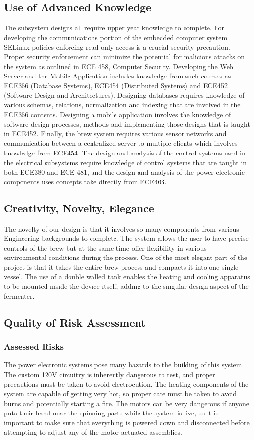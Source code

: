 \documentclass{article}
\begin{document}
\subsection{Use of Advanced Knowledge}
The subsystem designs all require upper year knowledge to complete. For developing the communications portion of the embedded computer system SELinux policies enforcing read only access is a crucial security precaution.  Proper security enforcement can minimize the potential for malicious attacks on the system as outlined in ECE 458, Computer Security.  Developing the Web Server and the Mobile Application includes knowledge from such courses as ECE356 (Database Systems), ECE454 (Distributed Systems) and ECE452 (Software Design and Architectures). Designing databases requires knowledge of various schemas, relations, normalization and indexing that are involved in the ECE356 contents. Designing a mobile application involves the knowledge of software design processes, methods and implementing those designs that is taught in ECE452. Finally, the brew system requires various sensor networks and communication between a centralized server to multiple clients which involves knowledge from ECE454. The design and analysis of the control systems used in the electrical subsystems require knowledge of control systems that are taught in both ECE380 and ECE 481, and the design and analysis of the power electronic components uses concepts take directly from ECE463.
\subsection{Creativity, Novelty, Elegance}
The novelty of our design is that it involves so many components from various Engineering backgrounds to complete. The system allows the user to have precise controls of the brew but at the same time offer flexibility in various environmental conditions during the process. One of the most elegant part of the project is that it takes the entire brew process and compacts it into one single vessel. The use of a double walled tank enables the heating and cooling apparatus to be mounted inside the device itself, adding to the singular design aspect of the fermenter.

\subsection{Quality of Risk Assessment}
\subsubsection{Assessed Risks}
The power electronic systems pose many hazards to the building of this system. The custom 120V circuitry is inherently dangerous to test, and proper precautions must be taken to avoid electrocution. The heating components of the system are capable of getting very hot, so proper care must be taken to avoid burns and potentially starting a fire. The motors can be very dangerous if anyone puts their hand near the spinning parts while the system is live, so it is important to make sure that everything is powered down and disconnected before attempting to adjust any of the motor actuated assemblies.
\end{document}

